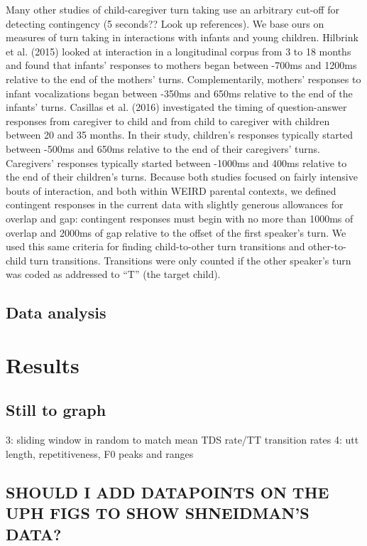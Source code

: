 \documentclass[man]{apa6}
\theoremstyle{definition}
\theoremstyle{definition}
\theoremstyle{definition}
\theoremstyle{remark}
\begin{document}
Many other studies of child-caregiver turn taking use an arbitrary
cut-off for detecting contingency (5 seconds?? Look up references). We
base ours on measures of turn taking in interactions with infants and
young children. Hilbrink et al. (2015) looked at interaction in a
longitudinal corpus from 3 to 18 months and found that infants'
responses to mothers began between -700ms and 1200ms relative to the end
of the mothers' turns. Complementarily, mothers' responses to infant
vocalizations began between -350ms and 650ms relative to the end of the
infants' turns. Casillas et al. (2016) investigated the timing of
question-answer responses from caregiver to child and from child to
caregiver with children between 20 and 35 months. In their study,
children's responses typically started between -500ms and 650ms relative
to the end of their caregivers' turns. Caregivers' responses typically
started between -1000ms and 400ms relative to the end of their
children's turns. Because both studies focused on fairly intensive bouts
of interaction, and both within WEIRD parental contexts, we defined
contingent responses in the current data with slightly generous
allowances for overlap and gap: contingent responses must begin with no
more than 1000ms of overlap and 2000ms of gap relative to the offset of
the first speaker's turn. We used this same criteria for finding
child-to-other turn transitions and other-to-child turn transitions.
Transitions were only counted if the other speaker's turn was coded as
addressed to \enquote{T} (the target child).

\subsection{Data analysis}\label{methods-analysisinfo}

\section{Results}\label{results}

\subsection{Still to graph}\label{still-to-graph}

3: sliding window in random to match mean TDS rate/TT transition rates
4: utt length, repetitiveness, F0 peaks and ranges

\subsection{SHOULD I ADD DATAPOINTS ON THE UPH FIGS TO SHOW SHNEIDMAN'S
DATA?}\label{should-i-add-datapoints-on-the-uph-figs-to-show-shneidmans-data}
\end{document}
